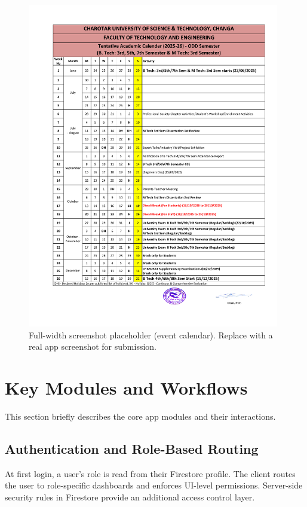 \documentclass[conference]{IEEEtran}
\begin{document}
\begin{figure}[t]
    \centering
    \includegraphics[width=0.98\textwidth]{assets/event_calendar.pdf}
    \caption{Full-width screenshot placeholder (event calendar). Replace with a real app screenshot for submission.}
    \label{fig:screenshot}
\end{figure}

\section{Key Modules and Workflows}
This section briefly describes the core app modules and their interactions.

\subsection{Authentication and Role-Based Routing}
At first login, a user's role is read from their Firestore profile. The client routes the user to role-specific dashboards and enforces UI-level permissions. Server-side security rules in Firestore provide an additional access control layer.
\end{document}

